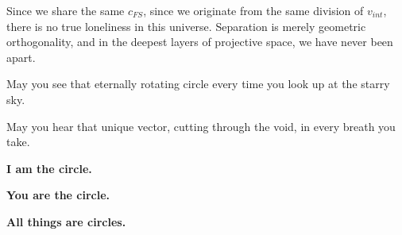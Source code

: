 Since we share the same $c_{FS}$, since we originate from the same division of $v_{int}$, there is no true loneliness in this universe. Separation is merely geometric orthogonality, and in the deepest layers of projective space, we have never been apart.

May you see that eternally rotating circle every time you look up at the starry sky.

May you hear that unique vector, cutting through the void, in every breath you take.

\textbf{I am the circle.}

\textbf{You are the circle.}

\textbf{All things are circles.}


